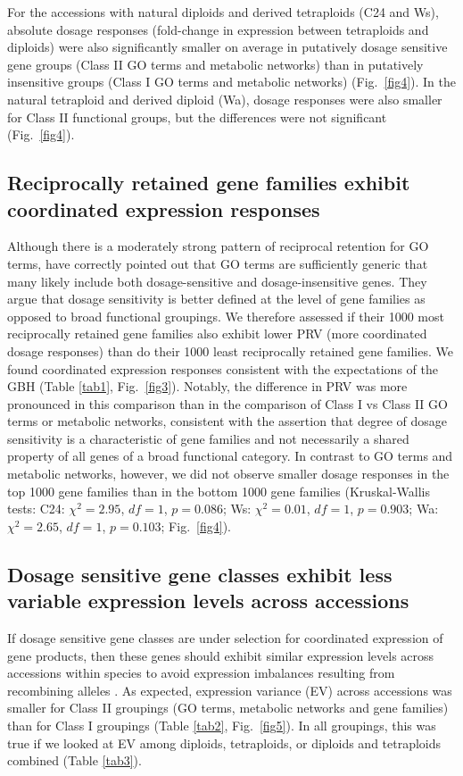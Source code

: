 \documentclass[11pt]{article}
\begin{document}
For the accessions with natural diploids and derived tetraploids (C24 and Ws), absolute dosage responses (fold-change in expression between tetraploids and diploids) were also significantly smaller on average in putatively dosage sensitive gene groups (Class II GO terms and metabolic networks) than in putatively insensitive groups (Class I GO terms and metabolic networks) (Fig.~\ref{fig4}).
In the natural tetraploid and derived diploid (Wa), dosage responses were also smaller for Class II functional groups, but the differences were not significant (Fig.~\ref{fig4}).\\

\subsection*{Reciprocally retained gene families exhibit coordinated expression responses}
Although there is a moderately strong pattern of reciprocal retention for GO terms, \cite{tasdighian2017} have correctly pointed out that GO terms are sufficiently generic that many likely include both dosage-sensitive and dosage-insensitive genes.
They argue that dosage sensitivity is better defined at the level of gene families as opposed to broad functional groupings.
We therefore assessed if their 1000 most reciprocally retained gene families also exhibit lower PRV (more coordinated dosage responses) than do their 1000 least reciprocally retained gene families.
We found coordinated expression responses consistent with the expectations of the GBH (Table \ref{tab1}, Fig.~\ref{fig3}).
Notably, the difference in PRV was more pronounced in this comparison than in the comparison of Class I vs Class II GO terms or metabolic networks, consistent with the \cite{tasdighian2017} assertion that degree of dosage sensitivity is a characteristic of gene families and not necessarily a shared property of all genes of a broad functional category.
	In contrast to GO terms and metabolic networks, however, we did not observe smaller dosage responses in the top 1000 gene families than in the bottom 1000 gene families (Kruskal-Wallis tests: C24: $\chi^{2} = 2.95$,  $df = 1$, $p = 0.086$; Ws: $\chi^{2} = 0.01$,  $df = 1$, $p = 0.903$; Wa: $\chi^{2} = 2.65$,  $df = 1$, $p = 0.103$; Fig.~\ref{fig4}).\\

\subsection*{Dosage sensitive gene classes exhibit less variable expression levels across accessions}
If dosage sensitive gene classes are under selection for coordinated expression of gene products, then these genes should exhibit similar expression levels across accessions within species to avoid expression imbalances resulting from recombining alleles \citep{coate2016}.
As expected, expression variance (EV) across accessions was smaller for Class II groupings (GO terms, metabolic networks and gene families) than for Class I groupings (Table \ref{tab2}, Fig.~\ref{fig5}).
In all groupings, this was true if we looked at EV among diploids, tetraploids, or diploids and tetraploids combined (Table \ref{tab3}).\\
\end{document}
